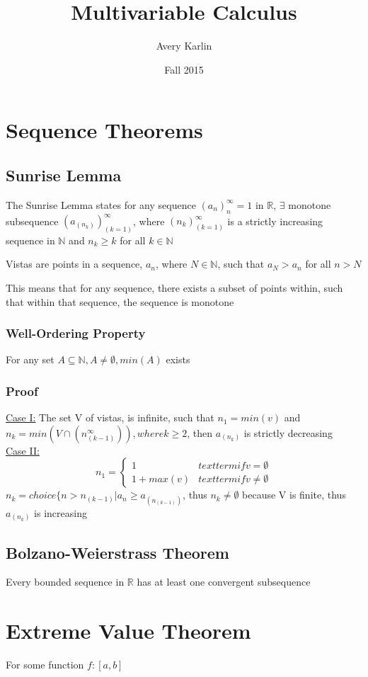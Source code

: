 \documentclass[11 pt, twoside]{article}
\begin{document}
\title{Multivariable Calculus}
\author{Avery Karlin}
\date{Fall 2015}

\maketitle
\newpage
\tableofcontents
\newpage



\section{Sequence Theorems}
\subsection{Sunrise Lemma}
The Sunrise Lemma states for any sequence $(a_n)^\infty_n=1$ in $\mathbb{R}$, $\exists$ monotone subsequence $(a_(n_k))^\infty_(k=1)$, where $(n_k)^\infty_(k=1)$ is a strictly increasing sequence in $\mathbb{N}$ and $n_k \geq k$ for all $k \in \mathbb{N}$

Vistas are points in a sequence, $a_n$, where  $N \in \mathbb{N}$, such that $a_N > a_n$ for all $n > N$

This means that for any sequence, there exists a subset of points within, such that within that sequence, the sequence is monotone

\subsubsection{Well-Ordering Property}
For any set $A \subseteq \mathbb{N}, A \neq \emptyset, min(A)$ exists

\subsubsection{Proof}
\underline{Case I:} The set V of vistas, is infinite, such that $n_1 = min(v)$ and $n_k = min(V \cap (n_(k-1)^\infty)), where k \geq 2$, then $a_(n_k)$ is strictly decreasing\\
\underline{Case II:}
\[ n_1 =
\begin{cases}
1 & textterm{if v = \emptyset} \\
1 + max(v) & textterm{if v \neq \emptyset}
\end{cases} \]
$n_k = choice\{n > n_(k-1) | a_n \geq a_(n_(k-1))$, thus $n_k \neq \emptyset$ because V is finite, thus $a_(n_k)$ is increasing

\subsection{Bolzano-Weierstrass Theorem}
Every bounded sequence in $\mathbb{R}$ has at least one convergent subsequence

\section{Extreme Value Theorem}
For some function $f:[a, b]$ 
\end{document}
